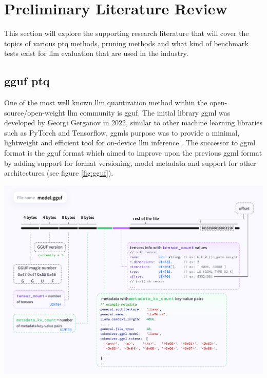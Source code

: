 \documentclass{ifacconf}
\begin{document}
	
	\section{Preliminary Literature Review}
	This section will explore the supporting research literature that will cover the topics of various \gls{ptq} methods, pruning methods and what kind of benchmark tests exist for \gls{llm} evaluation that are used in the industry. 
	
	\subsection{\gls{gguf} \gls{ptq}}
	
	One of the most well known \gls{llm} quantization method within the open-source/open-weight \gls{llm} community is \gls{gguf}. The initial library \gls{ggml} was developed by Georgi Gerganov in 2022, similar to other machine learning libraries such as PyTorch and Tensorflow, \glspl{ggml} purpose was to provide a minimal, lightweight and efficient tool for on-device \gls{llm} inference \cite{ggmlhuggingface}. The successor to \gls{ggml} format is the \gls{gguf} format which aimed to improve upon the previous \gls{ggml} format by adding support for format versioning, model metadata and support for other architectures \cite{ggmlgithubdocs} (see figure \ref{fig:gguf}).

	
	\begin{strip}
		\vspace{1em}
		\centering
		\includegraphics[width=\linewidth, height=0.45\textheight]{gguf}
		\label{fig:gguf}
	\end{strip}
	
\end{document}
